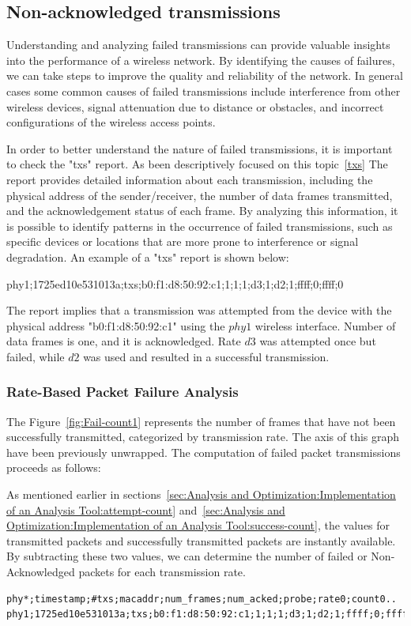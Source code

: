 \subsection{Non-acknowledged transmissions}

Understanding and analyzing failed transmissions can provide valuable insights into the performance of a wireless network. By identifying the causes of failures, we can take steps to improve the quality and reliability of the network. In general cases some common causes of failed transmissions include interference from other wireless devices, signal attenuation due to distance or obstacles, and incorrect configurations of the wireless access points.

In order to better understand the nature of failed transmissions, it is important to check the "txs" report. As been descriptively focused on this topic~\ref{txs} The report provides detailed information about each transmission, including the physical address of the sender/receiver, the number of data frames transmitted, and the acknowledgement status of each frame. By analyzing this information, it is possible to identify patterns in the occurrence of failed transmissions, such as specific devices or locations that are more prone to interference or signal degradation. An example of a "txs" report is shown below:
\vspace{0.2cm}

phy1;1725ed10e531013a;txs;b0:f1:d8:50:92:c1;1;1;1;d3;1;d2;1;ffff;0;ffff;0
\vspace{0.2cm}

The report implies that a transmission was attempted from the device with the physical address "b0:f1:d8:50:92:c1" using the $phy{1}$ wireless interface. Number of data frames is one, and it is acknowledged. Rate $d{3}$ was attempted once but failed, while $d{2}$ was used and resulted in a successful transmission.

\subsubsection{Rate-Based Packet Failure Analysis}
\label{failed-count}
The Figure~\ref{fig:Fail-count1} represents the number of frames that have not been successfully transmitted, categorized by transmission rate. The axis of this graph have been previously unwrapped. The computation of failed packet transmissions proceeds as follows:

As mentioned earlier in sections~\ref{sec:Analysis and Optimization:Implementation of an Analysis Tool:attempt-count} and~\ref{sec:Analysis and Optimization:Implementation of an Analysis Tool:success-count}, the values for transmitted packets and successfully transmitted packets are instantly available. By subtracting these two values, we can determine the number of failed or Non-Acknowledged packets for each transmission rate.
\begin{lstlisting}[basicstyle=\small]
phy*;timestamp;#txs;macaddr;num_frames;num_acked;probe;rate0;count0..
phy1;1725ed10e531013a;txs;b0:f1:d8:50:92:c1;1;1;1;d3;1;d2;1;ffff;0;ffff;0
\end{lstlisting}

